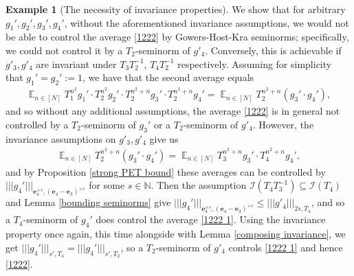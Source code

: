 \documentclass[11pt]{amsart}
\theoremstyle{definition}
\newtheorem{example}{Example}
\newcommand{\N}{{\mathbb N}}
\newcommand{\CI}{{\mathcal I}}
\newcommand{\be}{{\mathbf{e}}}
\newcommand{\nnorm}[1]{\lvert\!|\!| #1|\!|\!\rvert}
\newcommand{\inv}{^{-1}}
\DeclareMathOperator*{\E}{\mathbb{E}}
\begin{document}
\begin{example}[The necessity of invariance properties]
We show that for arbitrary $g_1', g_2', g_3', g_4'$, without the aforementioned invariance assumptions, we would not be able to control the average \eqref{1222} by Gowers-Host-Kra seminorms; specifically, we could not control it by a $T_2$-seminorm of $g'_4$. Conversely, this is achievable if $g'_3, g'_4$ are invariant under $T_3T_2\inv$, $T_4T_2\inv$ respectively. Assuming for simplicity that $g_1'=g_2':= 1$, we have that the second average equals
\begin{align*}
    \E_{n\in[N]}T_1^{n^2} g_1'\cdot T_2^{n^2} g_2'\cdot T_2^{n^2+n}g_3'\cdot T_2^{n^2+n}g_4' = \E_{n\in[N]}T_2^{n^2+n}(g_3'\cdot g_4'),
\end{align*}
and so without any additional assumptions, the average \eqref{1222} is in general not controlled by a $T_2$-seminorm of $g_3'$ or a $T_2$-seminorm of $g'_4$.
However, the invariance assumptions on $g'_3, g'_4$ give us
\begin{align}\label{1222 1}
    \E_{n\in[N]}T_2^{n^2+n}(g_3'\cdot g_4') = \E_{n\in[N]} T_3^{n^2+n}g_3'\cdot T_4^{n^2+n}g_4',
\end{align}
and by Proposition \ref{strong PET bound} these averages  can be controlled by $\nnorm{g_4'}_{\be_4^{\times s}, (\be_4-\be_3)^{\times s}}$ for some $s\in\N$.  Then the assumption $\CI(T_4 T_3\inv)\subseteq\CI(T_4)$ and Lemma \ref{bounding seminorms} give $\nnorm{g_4'}_{\be_4^{\times s}, (\be_4-\be_3)^{\times s}} \leq \nnorm{g'_4}_{2s, T_4}$, and so a $T_4$-seminorm of $g_4'$ does control the average \eqref{1222 1}. Using the invariance property once again, this time alongside with Lemma \ref{composing invariance}, we get $\nnorm{g_4'}_{s', T_4} =\nnorm{g_4'}_{s', T_2}$,
so a $T_2$-seminorm of $g'_4$ controls \eqref{1222 1} and hence \eqref{1222}.


\end{example}
\end{document}

